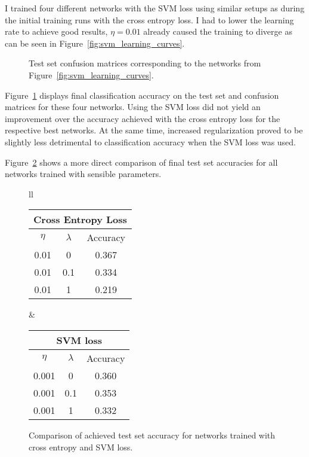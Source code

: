\documentclass{article}
\begin{document}
I trained four different networks with the SVM loss using similar setups as
during the initial training runs with the cross entropy loss. I had to lower
the learning rate to achieve good results, $\eta = 0.01$ already caused the
training to diverge as can be seen in Figure~\ref{fig:svm_learning_curves}.

\begin{figure}
  \centering
  
  \caption{Test set confusion matrices corresponding to the networks from
           Figure~\ref{fig:svm_learning_curves}.}
  \label{fig:svm_confusion_matrices}
\end{figure}

Figure~\ref{fig:svm_confusion_matrices} displays final classification accuracy
on the test set and confusion matrices for these four networks. Using the SVM
loss did not yield an improvement over the accuracy achieved with the cross
entropy loss for the respective best networks. At the same time, increased
regularization proved to be slightly less detrimental to classification
accuracy when the SVM loss was used.

Figure~\ref{fig:svm_total_accuracy} shows a more direct comparison of final
test set accuracies for all networks trained with sensible parameters.

\begin{figure}
  \centering
  \begin{tabular}{ll}
    \begin{tabular}{|c|c|c|}
      \multicolumn{3}{c}{\textbf{Cross Entropy Loss}} \\
      \hline
      $\eta$ & $\lambda$ & Accuracy \\
      \hline
      0.01   & 0         & 0.367    \\
      \hline
      0.01   & 0.1       & 0.334    \\
      \hline
      0.01   & 1         & 0.219    \\
      \hline
    \end{tabular}
    &
    \begin{tabular}{|c|c|c|}
      \multicolumn{3}{c}{\textbf{SVM loss}} \\
      \hline
      $\eta$ & $\lambda$ & Accuracy \\
      \hline
      0.001  & 0         & 0.360    \\
      \hline
      0.001  & 0.1       & 0.353    \\
      \hline
      0.001  & 1         & 0.332    \\
      \hline
    \end{tabular}
  \end{tabular}
  \caption{Comparison of achieved test set accuracy for networks trained with
           cross entropy and SVM loss.}
  \label{fig:svm_total_accuracy}
\end{figure}
\end{document}

